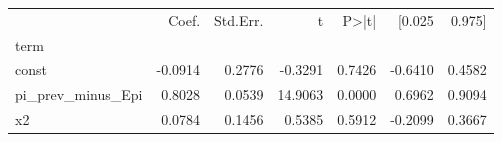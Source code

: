 \begin{tabular}{lrrrrrr}
\toprule
 & Coef. & Std.Err. & t & P>|t| & [0.025 & 0.975] \\
term &  &  &  &  &  &  \\
\midrule
const & -0.0914 & 0.2776 & -0.3291 & 0.7426 & -0.6410 & 0.4582 \\
pi_prev_minus_Epi & 0.8028 & 0.0539 & 14.9063 & 0.0000 & 0.6962 & 0.9094 \\
x2 & 0.0784 & 0.1456 & 0.5385 & 0.5912 & -0.2099 & 0.3667 \\
\bottomrule
\end{tabular}
